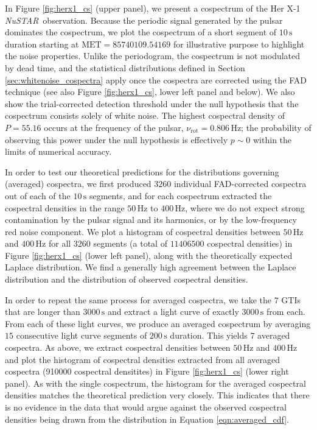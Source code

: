 \documentclass[12pt]{emulateapj}
\newcommand{\project}[1]{\textsl{#1}}
\newcommand{\nustar}{\project{NuSTAR}\xspace}
\begin{document}
\begin{bf}
In Figure \ref{fig:herx1_cs} (upper panel), we present a cospectrum of the Her X-1 \nustar\ observation. Because the periodic signal generated by the pulsar dominates the cospectrum, we plot the cospectrum of a short segment of $10\,\mathrm{s}$ duration starting at $\mathrm{MET} = 85740109.54169$ for illustrative purpose to highlight the noise properties. Unlike the periodogram, the cospectrum is not modulated by dead time, and the statistical distributions defined in Section \ref{sec:whitenoise_cospectra} apply once the cospectra are corrected using the FAD technique (see also Figure \ref{fig:herx1_cs}, lower left panel and below). We also show the trial-corrected detection threshold under the null hypothesis that the cospectrum consists solely of white noise. The highest cospectral density of $P = 55.16$ occurs at the frequency of the pulsar, $\nu_\mathrm{rot} = 0.806\,\mathrm{Hz}$; the probability of observing this power under the null hypothesis is effectively $p \sim 0$ within the limits of numerical accuracy. 

In order to test our theoretical predictions for the distributions governing (averaged) cospectra, we first produced $3260$ individual FAD-corrected cospectra out of each of the $10\,\mathrm{s}$ segments, and for each cospectrum extracted the cospectral densities in the range $50\,\mathrm{Hz}$ to $400\,\mathrm{Hz}$, where we do not expect strong contamination by the pulsar signal and its harmonics, or by the low-frequency red noise component.  We plot a histogram of cospectral densities between $50\,\mathrm{Hz}$ and $400\,\mathrm{Hz}$ for all $3260$ segments (a total of $11406500$ cospectral densities) in Figure \ref{fig:herx1_cs} (lower left panel), along with the theoretically expected Laplace distribution. We find a generally high agreement between the Laplace distribution and the distribution of observed cospectral densities. 

In order to repeat the same process for averaged cospectra, we take the $7$ GTIs that are longer than $3000\,\mathrm{s}$  and extract a light curve of exactly $3000\,\mathrm{s}$ from each. From each of these light curves, we produce an averaged cospectrum by averaging $15$ consecutive light curve segments of $200\,\mathrm{s}$ duration. This yields $7$ averaged cospectra. As above, we extract cospectral densities between $50\,\mathrm{Hz}$ and $400\,\mathrm{Hz}$ and plot the histogram of cospectral densities extracted from all averaged cospectra (910000 cospectral densitites) in Figure \ref{fig:herx1_cs} (lower right panel). As with the single cospectrum, the histogram for the averaged cospectral densities matches the theoretical prediction very closely. This indicates that there is no evidence in the data that would argue against the observed cospectral densities being drawn from the distribution in Equation \ref{eqn:averaged_cdf}.
\end{bf}
\end{document}
